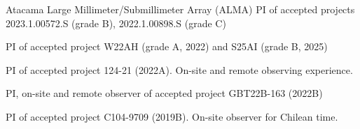 

\begin{cvskills}
	
	\cvskill
	{Atacama Large Millimeter/Submillimeter Array (ALMA)} %
	{PI of accepted projects 2023.1.00572.S (grade B), 2022.1.00898.S (grade C)} %
	
{PI of accepted project W22AH (grade A, 2022) and S25AI (grade B, 2025)}

{PI of accepted project 124-21 (2022A).  On-site and remote observing \newline experience.}

{PI, on-site and remote observer of accepted project GBT22B-163 (2022B)}

{PI of accepted project C104-9709 (2019B). On-site observer for Chilean \newline time. }

\end{cvskills}


%	
%
%	
%
%
%

%
%	
%	
%
%	
%	
